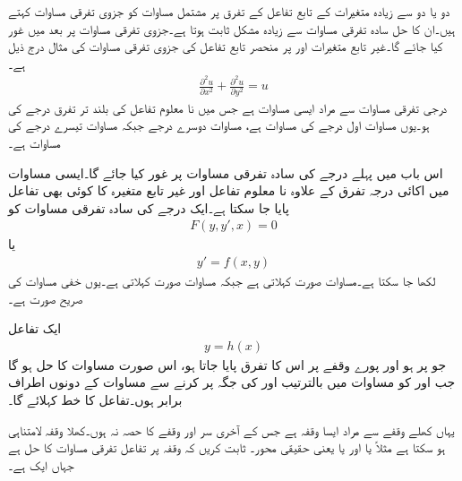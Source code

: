 دو یا دو سے زیادہ  متغیرات کے تابع تفاعل کے تفرق پر مشتمل مساوات کو جزوی تفرقی مساوات کہتے ہیں۔ان کا حل سادہ تفرقی مساوات  سے زیادہ مشکل ثابت ہوتا ہے۔جزوی تفرقی مساوات پر بعد میں غور کیا جائے گا۔غیر تابع متغیرات  اور  پر منحصر تابع تفاعل  کی جزوی تفرقی مساوات کی مثال درج ذیل ہے۔
\begin{align}
\frac{\partial^2 u}{\partial x^2}+\frac{\partial^2 u}{\partial y^2}=u
\end{align}
 درجی تفرقی مساوات سے مراد ایسی مساوات ہے جس میں نا معلوم تفاعل  کی بلند تر تفرق  درجے کی ہو۔یوں مساوات  اول درجے کی مساوات ہے، مساوات  دوسرے درجے  جبکہ مساوات  تیسرے درجے کی مساوات ہے۔

اس باب میں پہلے درجے کی سادہ تفرقی مساوات پر غور کیا جائے گا۔ایسی مساوات میں اکائی درجہ تفرق  کے علاوہ نا معلوم تفاعل  اور غیر تابع متغیرہ کا کوئی بھی تفاعل  پایا جا سکتا ہے۔ایک درجے کی سادہ تفرقی مساوات کو
\begin{align}\label{مساوات_سادہ_اول_درجہ_خفی}
F(y,y',x)=0
\end{align}
یا 
\begin{align}\label{مساوات_سادہ_اول_درجہ_صریح}
y'=f(x,y)
\end{align}
لکھا جا سکتا ہے۔مساوات    صورت کہلاتی ہے جبکہ مساوات   صورت کہلاتی ہے۔یوں خفی مساوات کی صریح صورت  ہے۔

ایک تفاعل
\begin{align}
y=h(x)
\end{align}
جو   پر  ہو اور پورے وقفے پر اس کا تفرق پایا جاتا ہو، اس صورت مساوات  کا حل ہو گا جب  اور  کو  مساوات  میں بالترتیب  اور  کی جگہ پر کرنے سے مساوات کے دونوں اطراف برابر ہوں۔تفاعل  کا خط  کہلائے گا۔

یہاں کھلے وقفے سے مراد ایسا وقفہ ہے جس کے آخری سر  اور  وقفے کا حصہ نہ ہوں۔کھلا وقفہ لامتناہی ہو سکتا ہے مثلاً  یا  اور  یا  یعنی حقیقی محور۔
ثابت کریں کہ وقفہ  پر تفاعل  تفرقی مساوات  کا حل ہے جہاں  ایک  ہے۔

